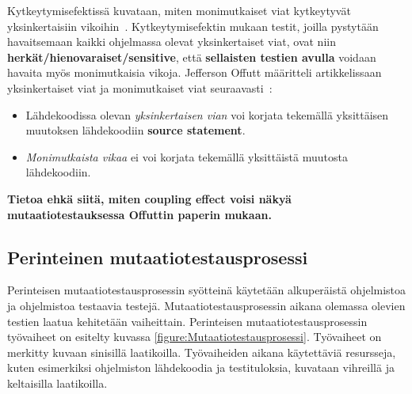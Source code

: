 \documentclass[finnish, grading]{tktltiki2}
\theoremstyle{definition}
\theoremstyle{remark}
\begin{document}
Kytkeytymisefektissä kuvataan, miten monimutkaiset viat kytkeytyvät yksinkertaisiin vikoihin~\cite[s. 35]{DeMillo:Lipton:Sayward:1978}. Kytkeytymisefektin mukaan testit, joilla pystytään havaitsemaan kaikki ohjelmassa olevat yksinkertaiset viat, ovat niin \textbf{herkät/hienovaraiset/sensitive}, että \textbf{sellaisten testien avulla} voidaan havaita myös monimutkaisia vikoja. Jefferson Offutt määritteli artikkelissaan yksinkertaiset viat ja monimutkaiset viat seuraavasti~\cite[s. 6]{Offutt:1992:Coupling}:
\begin{itemize}
  \item Lähdekoodissa olevan \textit{yksinkertaisen vian} voi korjata tekemällä yksittäisen muutoksen lähdekoodiin \textbf{source statement}.
  \item \textit{Monimutkaista vikaa} ei voi korjata tekemällä yksittäistä muutosta lähdekoodiin.
\end{itemize}

\textbf{Tietoa ehkä siitä, miten coupling effect voisi näkyä mutaatiotestauksessa Offuttin paperin mukaan.}



\subsection{Perinteinen mutaatiotestausprosessi}

Perinteisen mutaatiotestausprosessin syötteinä käytetään alkuperäistä ohjelmistoa ja ohjelmistoa testaavia testejä. Mutaatiotestausprosessin aikana olemassa olevien testien laatua kehitetään vaiheittain. Perinteisen mutaatiotestausprosessin työvaiheet on esitelty kuvassa \ref{figure:Mutaatiotestausprosessi}. Työvaiheet on merkitty kuvaan sinisillä laatikoilla. Työvaiheiden aikana käytettäviä resursseja, kuten esimerkiksi ohjelmiston lähdekoodia ja testituloksia, kuvataan vihreillä ja keltaisilla laatikoilla.
\end{document}
